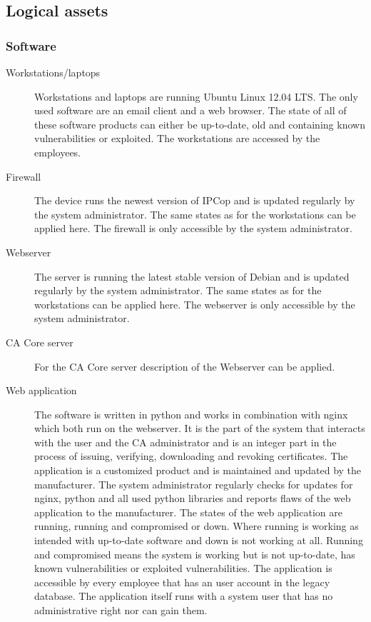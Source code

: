 \documentclass[a4paper, toc=index, 12pt, DIV14, twoside, BCOR2cm, headsepline, numbers=noenddot, bibliography=totoc]{report}
\begin{document}
\subsection{Logical assets}
\subsubsection{Software}
\begin{description}
\item[Workstations/laptops ] Workstations and laptops are running Ubuntu Linux 12.04 LTS. The only used software are an email client and a web browser. The state of all of these software products can either be up-to-date, old and containing known vulnerabilities or exploited. The workstations are accessed by the employees.
\item[Firewall ] The device runs the newest version of IPCop and is updated regularly by the system administrator. The same states as for the workstations can be applied here. The firewall is only accessible by the system administrator.
\item[Webserver ] The server is running the latest stable version of Debian and is updated regularly by the system administrator. The same states as for the workstations can be applied here. The webserver is only accessible by the system administrator.
\item[CA Core server ] For the CA Core server description of the Webserver can be applied.
\item[Web application ] The software is written in python and works in combination with nginx which both run on the webserver. It is the part of the system that interacts with the user and the CA administrator and is an integer part in the process of issuing, verifying, downloading and revoking certificates. The application is a customized product and is maintained and updated by the manufacturer. The system administrator regularly checks for updates for nginx, python and all used python libraries and reports flaws of the web application to the manufacturer. The states of the web application are running, running and compromised or down. Where running is working as intended with up-to-date software and down is not working at all. Running and compromised means the system is working but is not up-to-date, has known vulnerabilities or exploited vulnerabilities. The application is accessible by every employee that has an user account in the legacy database. The application itself runs with a system user that has no administrative right nor can gain them.

\end{description}
\end{document}
